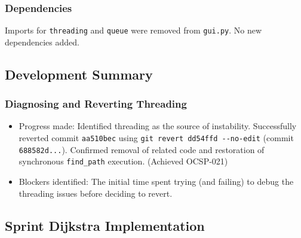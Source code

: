 \subsubsection{Dependencies}
Imports for \verb|threading| and \verb|queue| were removed from \verb|gui.py|. No new dependencies added. 

\subsection{Development Summary}

\subsubsection{Diagnosing and Reverting Threading}
\begin{itemize}
	\item Progress made: Identified threading as the source of instability. Successfully reverted commit \verb|aa510bec| using \verb|git revert dd54ffd --no-edit| (commit \verb|688582d...|). Confirmed removal of related code and restoration of synchronous \verb|find_path| execution. (Achieved OCSP-021)
	\item Blockers identified: The initial time spent trying (and failing) to debug the threading issues before deciding to revert.
\end{itemize}

\clearpage
\subsection{Sprint Dijkstra Implementation}

